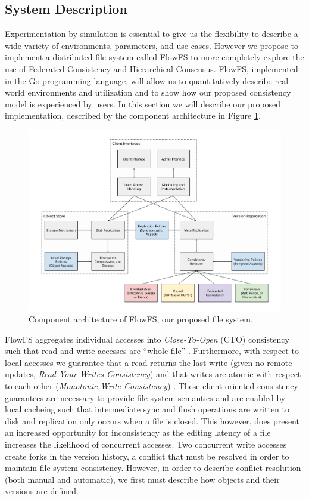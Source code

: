 \documentclass{article}
\begin{document}
\subsection{System Description}
\label{sec:system}

Experimentation by simulation is essential to give us the flexibility to describe a wide variety of environments, parameters, and use-cases. However we propose to implement a distributed file system called FlowFS to more completely explore the use of Federated Consistency and Hierarchical Consensus. FlowFS, implemented in the Go programming language, will allow us to quantitatively describe real-world environments and utilization and to show how our proposed consistency model is experienced by users. In this section we will describe our proposed implementation, described by the component architecture in Figure \ref{fig:architecture}.

\begin{figure}
    \centering
        \includegraphics[width=\textwidth]{figures/architecture}
        \caption{Component architecture of FlowFS, our proposed file system.}
        \label{fig:architecture}
\end{figure}

FlowFS aggregates individual accesses into \textit{Close-To-Open} (CTO) consistency such that read and write accesses are ``whole file'' \cite{muthitacharoen_low-bandwidth_2001}. Furthermore, with respect to local accesses we guarantee that a read returns the last write (given no remote updates, \textit{Read Your Writes Consistency}) and that writes are atomic with respect to each other (\textit{Monotonic Write Consistency}) \cite{bermbach_consistency_2013}. These client-oriented consistency guarantees are necessary to provide file system semantics and are enabled by local cacheing such that intermediate sync and flush operations are written to disk and replication only occurs when a file is closed. This however, does present an increased opportunity for inconsistency as the editing latency of a file increases the likelihood of concurrent accesses. Two concurrent write accesses create forks in the version history, a conflict that must be resolved in order to maintain file system consistency. However, in order to describe conflict resolution (both manual and automatic), we first must describe how objects and their versions are defined.
\end{document}
